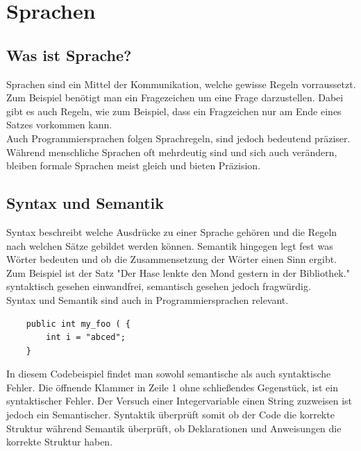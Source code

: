 \documentclass{article}
\begin{document}
	\section{Sprachen}
	\subsection{Was ist Sprache?}
	Sprachen sind ein Mittel der Kommunikation, welche gewisse Regeln vorraussetzt. Zum Beispiel benötigt man ein Fragezeichen um eine Frage darzustellen. Dabei gibt es auch Regeln, wie zum Beispiel, dass ein Fragzeichen nur am Ende eines Satzes vorkommen kann. \\
	Auch Programmiersprachen folgen Sprachregeln, sind jedoch bedeutend präziser. Während menschliche Sprachen oft mehrdeutig sind und sich auch verändern, bleiben formale Sprachen meist gleich und bieten Präzision. \\
	\subsection{Syntax und Semantik}
	Syntax beschreibt welche Ausdrücke zu einer Sprache gehören und die Regeln nach welchen Sätze gebildet werden können. Semantik hingegen legt fest was Wörter bedeuten und ob die Zusammensetzung der Wörter einen Sinn ergibt. Zum Beispiel ist der Satz "Der Hase lenkte den Mond gestern in der Bibliothek." syntaktisch gesehen einwandfrei, semantisch gesehen jedoch fragwürdig. \\
	Syntax und Semantik sind auch in Programmiersprachen relevant. \\
	\begin{verbatim}
	public int my_foo ( {
		int i = "abced";
	}
	\end{verbatim}
	In diesem Codebeispiel findet man sowohl semantische als auch syntaktische Fehler. Die öffnende Klammer in Zeile 1 ohne schließendes Gegenstück, ist ein syntaktischer Fehler. Der Versuch einer Integervariable einen String zuzweisen ist jedoch ein Semantischer. Syntaktik überprüft somit ob der Code die korrekte Struktur während Semantik überprüft, ob Deklarationen und Anweisungen die korrekte Struktur haben. \\
\end{document}
